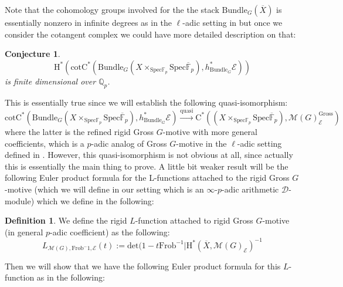 \documentclass[11pt]{book}
\newtheorem{conjecture}[theorem]{Conjecture}
\theoremstyle{definition}
\newtheorem{definition}[theorem]{Definition}
\numberwithin{equation}{section}
\begin{document}
Note that the cohomology groups involved for the the stack $\mathrm{Bundle}_G(\overline{X})$ is essentially nonzero in infinite degrees as in the $\ell$-adic setting in \cite{GL1} but once we consider the cotangent complex we could have more detailed description on that:

\begin{conjecture}
\begin{displaymath}
\mathrm{H}^{*}(\mathrm{cot}\mathrm{C}^*(\mathrm{Bundle}_G(X\times_{\mathrm{Spec}\mathbb{F}_p} \mathrm{Spec}\overline{\mathbb{F}}_p),h_{\mathrm{Bundle}_G}^*\mathcal{E}))\end{displaymath}
is finite dimensional over $\mathbb{Q}_p$.
\end{conjecture}


This is essentially true since we will establish the following quasi-isomorphism:
\begin{displaymath}
\mathrm{cot}\mathrm{C}^*(\mathrm{Bundle}_G(X\times_{\mathrm{Spec}\mathbb{F}_p} \mathrm{Spec}\overline{\mathbb{F}}_p),h_{\mathrm{Bundle}_G}^*\mathcal{E})\overset{\mathrm{quasi}}{\longrightarrow} \mathrm{C}^*((X\times_{\mathrm{Spec}\mathbb{F}_p} \mathrm{Spec}\overline{\mathbb{F}}_p),\mathcal{M}(G)^\mathrm{Gross}_\mathcal{E})
\end{displaymath}
where the latter is the refined rigid Gross $G$-motive with more general coefficients, which is a $p$-adic analog of Gross $G$-motive in the $\ell$-adic setting defined in \cite{Gro1}. However, this quasi-isomorphism is not obvious at all, since actually this is essentially the main thing to prove. A little bit weaker result will be the following Euler product formula for the L-functions attached to the rigid Gross $G$-motive (which we will define in our setting which is an $\infty$-$p$-adic arithmetic $\mathcal{D}$-module) which we define in the following:


\begin{definition}
We define the rigid $L$-function attached to rigid Gross $G$-motive (in general $p$-adic coefficient) as the following:
\begin{displaymath}
L_{\mathcal{M}(G),\mathrm{Frob}^-1,\mathcal{E}}(t):=\mathrm{det}(1-t\mathrm{Frob}^{-1}|\mathrm{H}^*(\overline{X},\mathcal{M}(G)_\mathcal{E})^{-1}
\end{displaymath}
\end{definition}


Then we will show that we have the following Euler product formula for this $L$-function as in the following:
\end{document}
